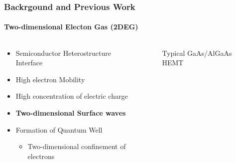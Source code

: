 \documentclass[mathserif,18pt,xcolor=table]{beamer}
\begin{document}
\begin{frame}
  \frametitle{Backrgound and Previous Work}
  \framesubtitle{Two-dimensional Electon Gas (2DEG)}

  \begin{columns} %
    \begin{column}{.5\textwidth}
      \begin{minipage}[T][.1\textheight][c]{\linewidth}
        \begin{itemize}
          \item Semiconductor Heterostructure Interface
          \item High electron Mobility
          \item High concentration of electric charge
          \item \textbf{Two-dimensional Surface waves}
          \item Formation of Quantum Well
          \begin{itemize}
            \item[]{Two-dimensional confinement of electrons}
          \end{itemize}
        \end{itemize}
      \end{minipage}
    \end{column}
    \begin{column}{.5\textwidth}
      \begin{figure}
        \def\svgwidth{\linewidth}
        
        \caption{Typical GaAs/AlGaAs HEMT}
      \end{figure}
      \end{column}%
    \end{columns}
\end{frame}
\end{document}
